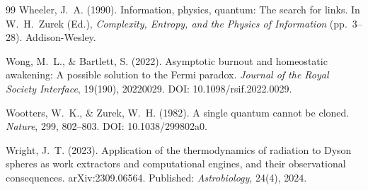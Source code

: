 \documentclass[12pt, a4paper]{article}
\begin{document}
\begin{thebibliography}{99}
Wheeler, J.~A. (1990). Information, physics, quantum: The search for links. In
W.~H.~Zurek (Ed.), \textit{Complexity, Entropy, and the Physics of Information}
(pp.~3--28). Addison-Wesley.

Wong, M.~L., \& Bartlett, S. (2022). Asymptotic burnout and homeostatic awakening: A
possible solution to the Fermi paradox. \textit{Journal of the Royal Society Interface},
19(190), 20220029. DOI: 10.1098/rsif.2022.0029.

Wootters, W.~K., \& Zurek, W.~H. (1982). A single quantum cannot be cloned. \textit{Nature},
299, 802--803. DOI: 10.1038/299802a0.

Wright, J.~T. (2023). Application of the thermodynamics of radiation to Dyson spheres as
work extractors and computational engines, and their observational consequences.
arXiv:2309.06564. Published: \textit{Astrobiology}, 24(4), 2024.

\end{thebibliography}
\end{document}
